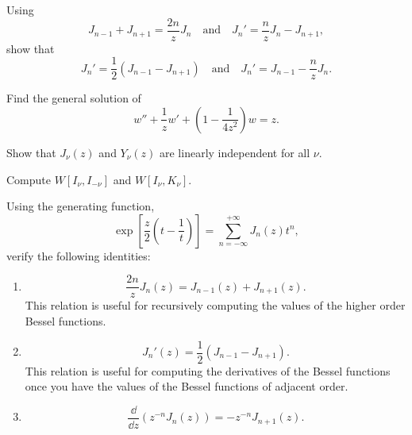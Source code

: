 {%
\begin{Exercise}
  Using
  \[ 
  J_{n-1} + J_{n+1} = \frac{2 n}{z} J_n \quad \mathrm{and} \quad
  J_n' = \frac{n}{z} J_n - J_{n+1},
  \]
  show that
  \[ 
  J_n' = \frac{1}{2}(J_{n-1} - J_{n+1}) \quad \mathrm{and} \quad
  J_n' = J_{n-1} - \frac{n}{z} J_n.
  \]
\end{Exercise}



\begin{Exercise}
  Find the general solution of
  \[ 
  w'' + \frac{1}{z} w' + \left( 1 - \frac{1}{4z^2} \right) w = z. 
  \]
\end{Exercise}




\begin{Exercise}
  Show that $J_\nu(z)$ and $Y_\nu(z)$ are linearly independent for all $\nu$.
\end{Exercise}





\begin{Exercise}
  Compute $W[ I_\nu, I_{-\nu} ]$ and $W[ I_\nu, K_\nu ]$.
\end{Exercise}








\begin{Exercise}
  Using the generating function,
  \[
  \exp\left[ \frac{z}{2} \left( t - \frac{1}{t}\right)\right] = 
  \sum_{n=-\infty}^{+\infty} J_n(z) t^n,
  \]
  verify the following identities:
  \begin{enumerate}
  \item
    \[
    \frac{2 n}{z} J_n(z) = J_{n-1}(z) + J_{n+1}(z).
    \]
    This relation is useful for recursively computing the values of the
    higher order Bessel functions.
  \item
    \[
    J_n'(z) = \frac{1}{2} \left ( J_{n-1} - J_{n+1} \right ).
    \]
    This relation is useful for computing the derivatives of the Bessel
    functions once you have the values of the Bessel functions of adjacent
    order.
  \item 
    \[
    \frac{\dd}{\dd z} \left ( z^{-n} J_n(z) \right) = -z^{-n} J_{n+1} (z). 
    \]
  \end{enumerate}
\end{Exercise}





}
